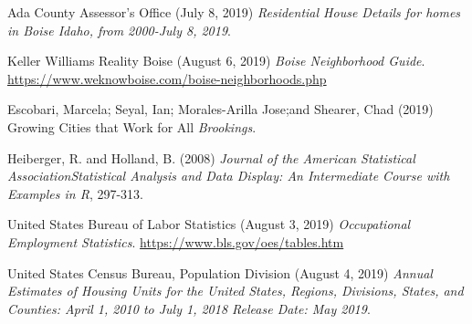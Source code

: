\documentclass{article}
\begin{document}
\newpage
\begin{thebibliography}{3}

Ada County Assessor's Office (July 8, 2019)
\newblock \textit{Residential House Details for homes in Boise Idaho, from 2000-July 8, 2019}.


Keller Williams Reality Boise (August 6, 2019)
\newblock \textit{Boise Neighborhood Guide}.
\newblock \url{https://www.weknowboise.com/boise-neighborhoods.php}




Escobari, Marcela; Seyal, Ian; Morales-Arilla Jose;and Shearer, Chad (2019)
\newblock Growing Cities that Work for All
\newblock \textit{Brookings}.

Heiberger, R. and Holland, B. (2008)
\newblock 
\newblock \textit{Journal of the American Statistical AssociationStatistical Analysis and Data Display: An Intermediate Course with Examples in R}, 297-313.


United States Bureau of Labor Statistics (August 3, 2019)
\newblock \textit{Occupational Employment Statistics}.
\newblock \url{https://www.bls.gov/oes/tables.htm}

United States Census Bureau, Population Division (August 4, 2019)
\newblock \textit{Annual Estimates of Housing Units for the United States, Regions, Divisions, States, and Counties: April 1, 2010 to July 1, 2018 Release Date: May 2019}.






\end{thebibliography}
\end{document}
